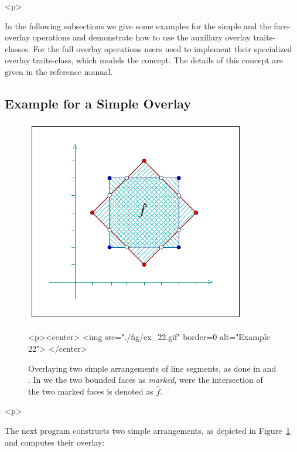 \begin{ccHtmlOnly}<p>\end{ccHtmlOnly}
In the following subsections we give some examples for the simple and the
face-overlay operations and demonstrate how to use the auxiliary overlay
traits-classes. For the full overlay operations users need to implement
their specialized overlay traits-class, which models the 
concept. The details of this concept are given in the reference manual.

\subsection{Example for a Simple Overlay}
\label{arr_ssec:simp_ovl}
%
\begin{figure}[!htp]
\begin{ccTexOnly}
  \begin{center}
  \includegraphics{Arrangement_2/fig/ex_22}
  \end{center}
\end{ccTexOnly}
\begin{ccHtmlOnly}
  <p><center>
  <img src="./fig/ex_22.gif" border=0 alt="Example 22">
  </center>
\end{ccHtmlOnly}
\caption{Overlaying two simple arrangements of line segments, as done
in  and . In  we 
the two bounded faces as {\em marked}, were the intersection of the two
marked faces is denoted as $\hat{f}$.}
\label{arr_fig:ex_22}
\end{figure}

\begin{ccHtmlOnly}<p>\end{ccHtmlOnly}
The next program constructs two simple arrangements, as depicted in
Figure~\ref{arr_fig:ex_22} and computes their overlay:

